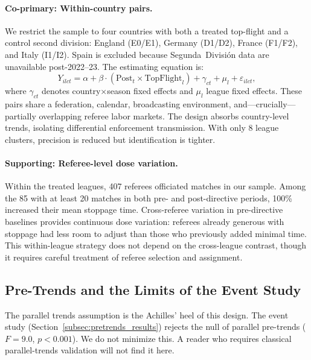 \paragraph{Co-primary: Within-country pairs.}
We restrict the sample to four countries with both a treated top-flight
and a control second division: England (E0/E1), Germany (D1/D2), France
(F1/F2), and Italy (I1/I2). Spain is excluded because Segunda~Divisi\'{o}n
data are unavailable post-2022--23. The estimating equation is:
\begin{equation}\label{eq:within}
  Y_{ilct} = \alpha + \beta \cdot (\text{Post}_t \times \text{TopFlight}_l)
  + \gamma_{ct} + \mu_l + \varepsilon_{ilct},
\end{equation}
where $\gamma_{ct}$ denotes country$\times$season fixed effects and
$\mu_l$ league fixed effects. These pairs share a federation, calendar,
broadcasting environment, and---crucially---partially overlapping referee
labor markets. The design absorbs country-level trends, isolating
differential enforcement transmission. With only 8 league clusters,
precision is reduced but identification is tighter.

\paragraph{Supporting: Referee-level dose variation.}
Within the treated leagues, 407 referees officiated matches in our sample.
Among the 85 with at least 20 matches in both pre- and post-directive
periods, 100\% increased their mean stoppage time. Cross-referee variation
in pre-directive baselines provides continuous dose variation: referees
already generous with stoppage had less room to adjust than those who
previously added minimal time. This within-league strategy does not depend
on the cross-league contrast, though it requires careful treatment of
referee selection and assignment.

\subsection{Pre-Trends and the Limits of the Event Study}
\label{subsec:pretrends}

The parallel trends assumption is the Achilles' heel of this design. The
event study (Section~\ref{subsec:pretrends_results}) rejects the null of
parallel pre-trends ($F = 9.0$, $p < 0.001$). We do not minimize this.
A reader who requires classical parallel-trends validation will not find it
here.

